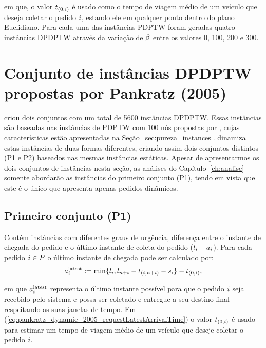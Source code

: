 
\noindent em que, o valor $t_{(0,i)}$ é usado como o tempo 
de viagem médio de um veículo que deseja coletar o pedido $i$, estando
ele em qualquer ponto dentro do plano Euclidiano.
Para cada uma das instâncias PDPTW foram geradas quatro instâncias DPDPTW 
através da variação de $\beta$ entre os valores 0, 100, 200 e 300.






\section{Conjunto de instâncias DPDPTW propostas por Pankratz (2005)}

\textcite{pankratz_dynamic_2005} criou dois conjuntos com um total de 5600 
instâncias DPDPTW.
Essas instâncias são baseadas nas instâncias de PDPTW com 100 nós propostas por
\textcite{li_metaheuristic_2003}, cujas características estão apresentadas 
na Seção~\ref{sec:pureza_instances}.
\textcite{pankratz_dynamic_2005} dinamiza estas instâncias de duas formas 
diferentes, criando assim dois conjuntos distintos (P1 e P2) baseados 
nas mesmas instâncias estáticas.
Apesar de apresentarmos os dois conjuntos de instâncias nesta seção, as 
análises do Capítulo~\ref{ch:analise} somente abordarão as instâncias do 
primeiro conjunto (P1), tendo em vista que este é o único que apresenta apenas
pedidos dinâmicos.


\subsection{Primeiro conjunto (P1)}
Contém instâncias com diferentes graus de urgência, diferença entre o instante 
de chegada do pedido  e o último instante de coleta do
pedido ($l_i - a_i$). 
Para cada pedido $i \in P$ o último instante de chegada 
pode ser calculado por: 
%
\begin{equation}
  a{}_{i{}}^{\mathrm{latest}} := 
  \min\{l_i, l_{n + i} 
  - t_{(i,n + i)} 
  - s_i\} - t_{(0,i)},
  \label{eq:pankratz_dynamic_2005_requestLatestArrivalTime}
\end{equation}

\noindent em que $a{}_{i{}}^{\mathrm{latest}}$ representa o último instante 
possível para que o pedido $i$ seja recebido pelo sistema e possa ser 
coletado e entregue a seu destino final respeitando as suas janelas de tempo.
Em (\ref{eq:pankratz_dynamic_2005_requestLatestArrivalTime}) o valor
$t_{(0,i)}$ é usado para estimar um tempo de 
viagem médio de um veículo que deseje coletar o pedido $i$.

